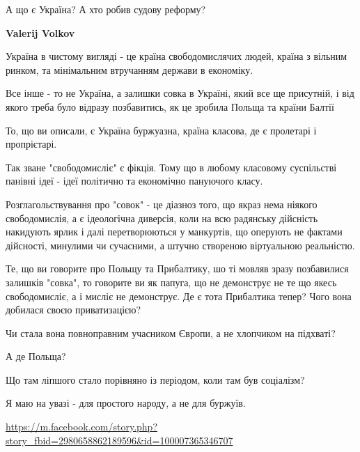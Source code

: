 \begin{itemize}
\begin{itemize}
А що є Україна?
А хто робив судову реформу?

 
\textbf{Valerij Volkov} 

Україна в чистому вигляді - це країна свободомислячих людей, країна з вільним
ринком, та мінімальним втручанням держави в економіку.

Все інше - то не Україна, а залишки совка в Україні, який все ще присутній, і
від якого треба було відразу позбавитись, як це зробила Польща та країни Балтії


 

То, що ви описали, є Україна буржуазна, країна класова, де є пролетарі і
пропрієтарі.

Так зване "свободомисліє" є фікція. Тому що в любому класовому суспільстві
панівні ідеї - ідеї політично та економічно пануючого класу.

Розглагольствування про "совок" - це діазноз того, що якраз нема ніякого
свободомислія, а є ідеологічна диверсія, коли на всю радянську дійсність
накидують ярлик і далі перетворюються у манкуртів, що оперують не фактами
дійсності, минулими чи сучасними, а штучно створеною віртуальною реальністю.

Те, що ви говорите про Польщу та Прибалтику, шо ті мовляв зразу позбавилися
залишків "совка", то говорите ви як папуга, що не демонструє не те що якесь
свободомисліє, а і мисліє не демонструє. Де є тота Прибалтика тепер? Чого вона
добилася своєю приватизацією?

Чи стала вона повноправним учасником Європи, а не хлопчиком на підхваті?

А де Польща?

Що там ліпшого стало порівняно із періодом, коли там був соціалізм?

Я маю на увазі - для простого народу, а не для буржуїв.

\url{https://m.facebook.com/story.php?story_fbid=2980658862189596&id=100007365346707}

 

\end{itemize}
\end{itemize}
